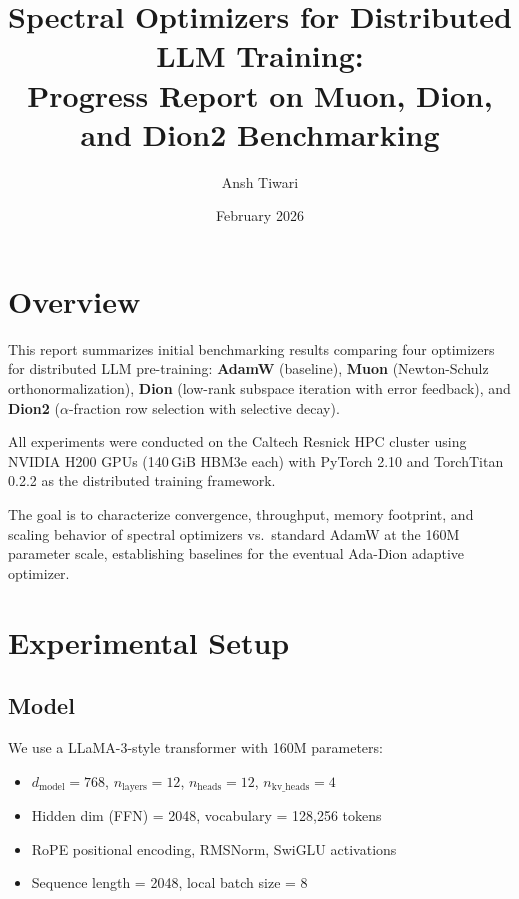 \documentclass[11pt,a4paper]{article}
\title{Spectral Optimizers for Distributed LLM Training:\\
Progress Report on Muon, Dion, and Dion2 Benchmarking}
\author{Ansh Tiwari}
\date{February 2026}
\begin{document}
\maketitle

\section{Overview}

This report summarizes initial benchmarking results comparing four optimizers for distributed LLM pre-training:
\textbf{AdamW} (baseline), \textbf{Muon} (Newton-Schulz orthonormalization), \textbf{Dion} (low-rank subspace iteration with error feedback), and \textbf{Dion2} ($\alpha$-fraction row selection with selective decay).

All experiments were conducted on the Caltech Resnick HPC cluster using NVIDIA H200 GPUs (140\,GiB HBM3e each) with PyTorch 2.10 and TorchTitan 0.2.2 as the distributed training framework.

The goal is to characterize convergence, throughput, memory footprint, and scaling behavior of spectral optimizers vs.\ standard AdamW at the 160M parameter scale, establishing baselines for the eventual Ada-Dion adaptive optimizer.

\section{Experimental Setup}

\subsection{Model}
We use a LLaMA-3-style transformer with 160M parameters:
\begin{itemize}
    \item $d_{\text{model}} = 768$, $n_{\text{layers}} = 12$, $n_{\text{heads}} = 12$, $n_{\text{kv\_heads}} = 4$
    \item Hidden dim (FFN) = 2048, vocabulary = 128,256 tokens
    \item RoPE positional encoding, RMSNorm, SwiGLU activations
    \item Sequence length = 2048, local batch size = 8
\end{itemize}
\end{document}
